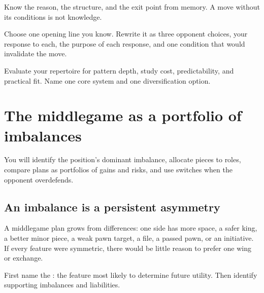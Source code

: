 \begin{memorybox}
Know the reason, the structure, and the exit point from memory. A move without its conditions is not knowledge.
\end{memorybox}

\begin{exercise}
Choose one opening line you know. Rewrite it as three opponent choices, your response to each, the purpose of each response, and one condition that would invalidate the move.
\end{exercise}

\begin{exercise}
Evaluate your repertoire for pattern depth, study cost, predictability, and practical fit. Name one core system and one diversification option.
\end{exercise}


\chapter{The middlegame as a portfolio of imbalances}
\begin{learningbox}
You will identify the position's dominant imbalance, allocate pieces to roles, compare plans as portfolios of gains and risks, and use switches when the opponent overdefends.
\end{learningbox}

\section{An imbalance is a persistent asymmetry}
A middlegame plan grows from differences: one side has more space, a safer king, a better minor piece, a weak pawn target, a file, a passed pawn, or an initiative. If every feature were symmetric, there would be little reason to prefer one wing or exchange.

First name the : the feature most likely to determine future utility. Then identify supporting imbalances and liabilities.

